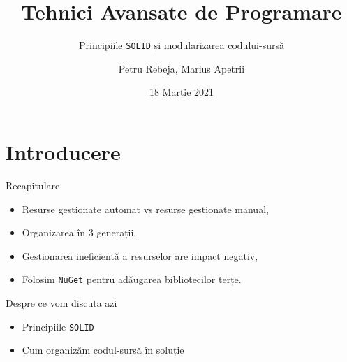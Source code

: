 \documentclass[presentation]{beamer}
\author{Petru Rebeja, Marius Apetrii}
\date{18 Martie 2021}
\title{Tehnici Avansate de Programare}
\subtitle{Principiile \texttt{SOLID} și modularizarea codului-sursă}
\institute[UAIC]{Facultatea de Matematică\\Universitatea Alexandru Ioan Cuza, Iași}
\begin{document}
\maketitle
\section{Introducere}
\label{sec:org2428c5f}
\begin{frame}[label={sec:org5e734f2},fragile]{Recapitulare}
 \begin{itemize}
\item Resurse gestionate automat vs resurse gestionate manual,
\item Organizarea în 3 generații,
\item Gestionarea ineficientă a resurselor are impact negativ,
\item Folosim \texttt{NuGet} pentru adăugarea bibliotecilor terțe.
\end{itemize}
\end{frame}
\begin{frame}[label={sec:org3f24f36},fragile]{Despre ce vom discuta azi}
 \begin{itemize}
\item Principiile \texttt{SOLID}
\item Cum organizăm codul-sursă în soluție
\end{itemize}
\end{frame}
\end{document}
